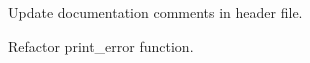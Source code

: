 
\begin{DoxyEnumerate}
\item Update documentation comments in header file.
\end{DoxyEnumerate}

Refactor print\+\_\+error function. 